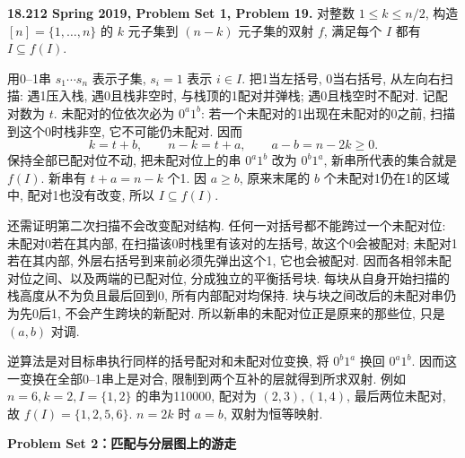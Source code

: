 \begin{exercise}\label{mit:18212-pset1-q19}
\textbf{18.212 Spring 2019, Problem Set 1, Problem 19.}
对整数 $1\le k\le n/2$, 构造 $[n]=\{1,\ldots,n\}$ 的 $k$ 元子集到 $(n-k)$ 元子集的双射 $f$, 满足每个 $I$ 都有 $I\subseteq f(I)$.
\end{exercise}
\begin{solution}
用0--1串 $s_1\cdots s_n$ 表示子集, $s_i=1$ 表示 $i\in I$. 把1当左括号, 0当右括号, 从左向右扫描: 遇1压入栈, 遇0且栈非空时, 与栈顶的1配对并弹栈; 遇0且栈空时不配对. 记配对数为 $t$. 未配对的位依次必为
$0^a1^b$: 若一个未配对的1出现在未配对的0之前, 扫描到这个0时栈非空, 它不可能仍未配对. 因而
\[
 k=t+b,\qquad n-k=t+a,\qquad a-b=n-2k\ge0.
\]
保持全部已配对位不动, 把未配对位上的串 $0^a1^b$ 改为 $0^b1^a$, 新串所代表的集合就是 $f(I)$. 新串有 $t+a=n-k$ 个1. 因 $a\ge b$, 原来末尾的 $b$ 个未配对1仍在1的区域中, 配对1也没有改变, 所以 $I\subseteq f(I)$.

还需证明第二次扫描不会改变配对结构. 任何一对括号都不能跨过一个未配对位: 未配对0若在其内部, 在扫描该0时栈里有该对的左括号, 故这个0会被配对; 未配对1若在其内部, 外层右括号到来前必须先弹出这个1, 它也会被配对. 因而各相邻未配对位之间、以及两端的已配对位, 分成独立的平衡括号块. 每块从自身开始扫描的栈高度从不为负且最后回到0, 所有内部配对均保持. 块与块之间改后的未配对串仍为先0后1, 不会产生跨块的新配对. 所以新串的未配对位正是原来的那些位, 只是 $(a,b)$ 对调.

逆算法是对目标串执行同样的括号配对和未配对位变换, 将 $0^b1^a$ 换回 $0^a1^b$. 因而这一变换在全部0--1串上是对合, 限制到两个互补的层就得到所求双射. 例如 $n=6,k=2,I=\{1,2\}$ 的串为110000, 配对为 $(2,3),(1,4)$, 最后两位未配对, 故 $f(I)=\{1,2,5,6\}$. $n=2k$ 时 $a=b$, 双射为恒等映射.
\end{solution}

\par\medskip\noindent\textbf{Problem Set 2：匹配与分层图上的游走}

